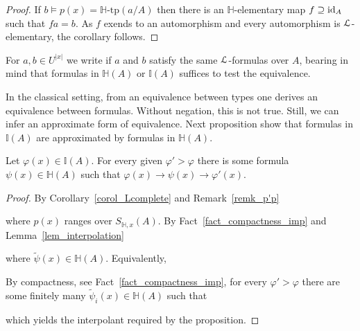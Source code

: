 \documentclass[10pt,oneside]{amsproc}
\renewcommand*{\emph}[1]{%
   \smash{\tikz[baseline]\node[rectangle, fill=teal!25, rounded corners, inner xsep=0.5ex, inner ysep=0.2ex, anchor=base, minimum height = 2.7ex]{#1};}}
\begin{document}
\begin{proof}
  If $b\models p(x)=\mathds{H}\mbox{-tp}(a/A)$ then there is an $\mathds{H}$-elementary map $f\supseteq{\rm id}_A$ such that $fa=b$.
  As $f$ exends to an automorphism and every automorphism is ${\EuScript L}$-elementary, the corollary follows.
\end{proof}

For $a,b\in U^{|x|}$ we write \emph{$a\equiv_Ab$\/} if $a$ and $b$ satisfy the same ${\EuScript L}$-formulas over $A$, bearing in mind that formulas in $\mathds{H}(A)$ or $\mathds{I}(A)$ suffices to test the equivalence.

In the classical setting, from an equivalence between types one derives an  equivalence between formulas.
Without negation, this is not true.
Still, we can infer an approximate form of equivalence.
Next proposition show that formulas in $\mathds{I}(A)$ are approximated by formulas in $\mathds{H}(A)$.

\begin{proposition}\label{prop_LHapprox1}
  Let $\varphi(x)\in\mathds{I}(A)$.
  For every given $\varphi'>\varphi$ there is some formula $\psi(x)\in\mathds{H}(A)$ such that $\varphi(x)\rightarrow\psi(x)\rightarrow\varphi'(x)$.
\end{proposition}

\begin{proof}
  By Corollary~\ref{corol_Lcomplete} and Remark~\ref{remk_p'p}


  where $p(x)$ ranges over $S_{\mathds{H},x}(A)$.
  By Fact~\ref{fact_compactness_imp} and Lemma~\ref{lem_interpolation}


  where $\tilde{\psi}(x)\in\mathds{H}(A)$.
  Equivalently,


  By compactness, see Fact~\ref{fact_compactness_imp}, for every $\varphi'>\varphi$ there are some finitely many $\tilde{\psi}_i(x)\in\mathds{H}(A)$ such that


  which yields the interpolant required by the proposition.
\end{proof}
\end{document}
